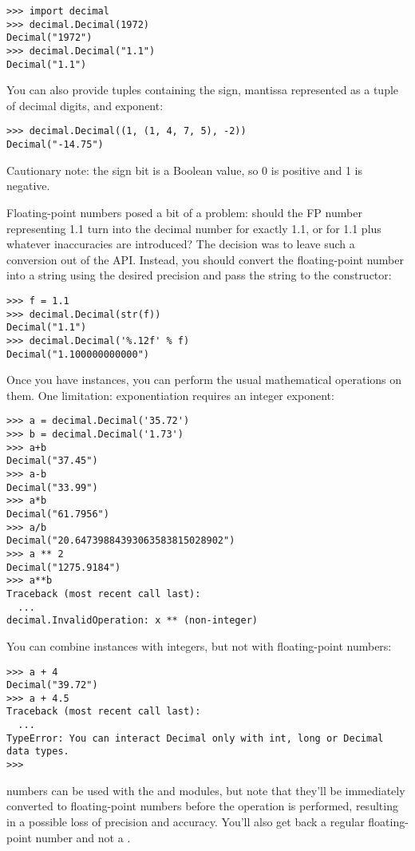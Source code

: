 \documentclass{howto}
\begin{document}
\begin{verbatim}
>>> import decimal
>>> decimal.Decimal(1972)
Decimal("1972")
>>> decimal.Decimal("1.1")
Decimal("1.1")
\end{verbatim}

You can also provide tuples containing the sign, mantissa represented 
as a tuple of decimal digits, and exponent:

\begin{verbatim}
>>> decimal.Decimal((1, (1, 4, 7, 5), -2))
Decimal("-14.75")
\end{verbatim}

Cautionary note: the sign bit is a Boolean value, so 0 is positive and 1 is negative.

Floating-point numbers posed a bit of a problem: should the FP number
representing 1.1 turn into the decimal number for exactly 1.1, or for
1.1 plus whatever inaccuracies are introduced?  The decision was to
leave such a conversion out of the API.  Instead, you should convert
the floating-point number into a string using the desired precision and 
pass the string to the  constructor:

\begin{verbatim}
>>> f = 1.1
>>> decimal.Decimal(str(f))
Decimal("1.1")
>>> decimal.Decimal('%.12f' % f)
Decimal("1.100000000000")
\end{verbatim}

Once you have  instances, you can perform the usual
mathematical operations on them.  One limitation: exponentiation
requires an integer exponent:

\begin{verbatim}
>>> a = decimal.Decimal('35.72')
>>> b = decimal.Decimal('1.73')
>>> a+b
Decimal("37.45")
>>> a-b
Decimal("33.99")
>>> a*b
Decimal("61.7956")
>>> a/b
Decimal("20.64739884393063583815028902")
>>> a ** 2
Decimal("1275.9184")
>>> a**b
Traceback (most recent call last):
  ...
decimal.InvalidOperation: x ** (non-integer)
\end{verbatim}

You can combine  instances with integers, but not with
floating-point numbers:

\begin{verbatim}
>>> a + 4
Decimal("39.72")
>>> a + 4.5
Traceback (most recent call last):
  ...
TypeError: You can interact Decimal only with int, long or Decimal data types.
>>>
\end{verbatim}

 numbers can be used with the  and
 modules, but note that they'll be immediately converted to 
floating-point numbers before the operation is performed, resulting in
a possible loss of precision and accuracy.  You'll also get back a
regular floating-point number and not a .  
\end{document}
